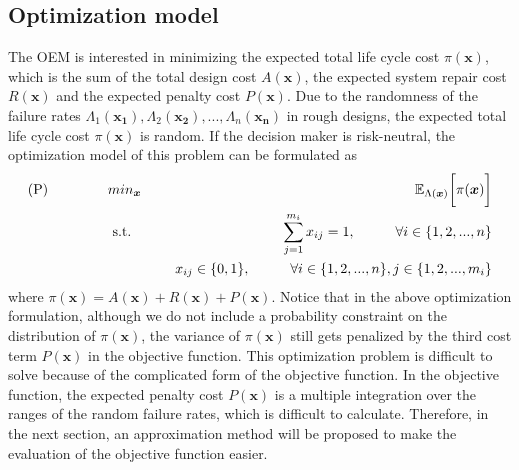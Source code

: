 \documentclass[preprint,12pt]{elsarticle}
\begin{document}
\subsection{Optimization model}
The OEM is interested in minimizing the expected total life cycle cost $\pi(\boldsymbol{x})$, which is the sum of the total design cost $A(\boldsymbol{x})$, the expected system repair cost $R(\boldsymbol{x})$ and the expected penalty cost $P(\boldsymbol{x})$. Due to the randomness of the failure rates $\Lambda_{1}(\boldsymbol{x_{1}}),\Lambda_{2}(\boldsymbol{x_{2}}),...,\Lambda_{n}(\boldsymbol{x_{n}})$ in rough designs, the expected total life cycle cost $\pi(\boldsymbol{x})$ is random. If the decision maker is risk-neutral, the optimization model of this problem can be formulated as
\begin{eqnarray}
\text{(P)} \hspace{15mm} & min_{\boldsymbol{x}} & \hspace{10mm} \mathbb{E}_{\Lambda(\boldsymbol{x})} \bigg[ \pi(\boldsymbol{x})\bigg] \nonumber\\
& \text{ s.t. }&  \hspace{5mm} \sum_{j=1}^{m_i}{x_{ij}}=1, \hspace{10mm} \forall i \in \{1,2,...,n\} \nonumber\\
& & \hspace{5mm} x_{ij} \in \{0,1\}, \hspace{10mm}  \forall i \in \{1,2,...,n\}, j \in \{1,2,...,m_i\}
\end{eqnarray}
where $\pi(\boldsymbol{x})=A(\boldsymbol{x})+R(\boldsymbol{x})+P(\boldsymbol{x})$. Notice that in the above optimization formulation, although we do not include a probability constraint on the distribution of $\pi(\boldsymbol{x})$, the variance of $\pi(\boldsymbol{x})$ still gets penalized by the third cost term $P(\boldsymbol{x})$ in the objective function. This optimization problem is difficult to solve because of the complicated form of the objective function. In the objective function, the expected penalty cost $P(\boldsymbol{x})$ is a multiple integration over the ranges of the random failure rates, which is difficult to calculate. Therefore, in the next section, an approximation method will be proposed to make the evaluation of the objective function easier.

%
\end{document}
